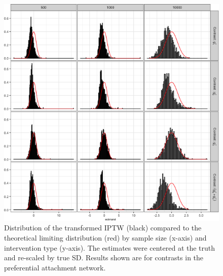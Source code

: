 \documentclass[english]{article}\usepackage[]{graphicx}\usepackage[]{color}
\makeatletter
\def\maxwidth{ %
  \ifdim\Gin@nat@width>\linewidth
    \linewidth
  \else
    \Gin@nat@width
  \fi
}
\newenvironment{knitrout}{}{} %
\theoremstyle{plain}
\theoremstyle{plain}
\makeatother
\begin{document}
\begin{knitrout}\footnotesize
{}\color{fgcolor}\begin{figure}

{\centering \includegraphics[width=\maxwidth]{TablesFigs/knitR-hist_IPTW_ATE_prefattach-1} 

}

\caption[Distribution of the transformed IPTW (black) compared to the theoretical limiting distribution (red) by sample size (x-axis) and intervention type (y-axis)]{Distribution of the transformed IPTW (black) compared to the theoretical limiting distribution (red) by sample size (x-axis) and intervention type (y-axis). The estimates were centered at the truth and re-scaled by true SD. Results shown are for contrasts in the preferential attachment network.}\label{fig:hist.IPTW.ATE.prefattach}
\end{figure}


\end{knitrout}
\end{document}
